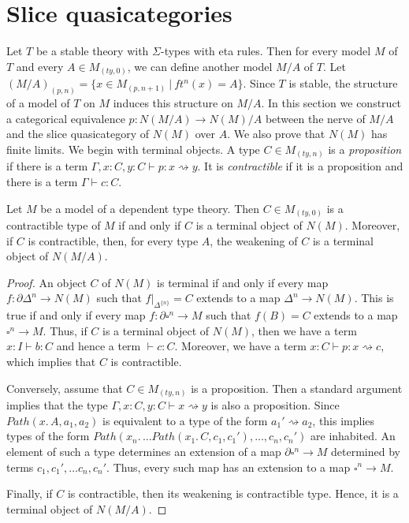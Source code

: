 \documentclass[reqno]{amsart}
\theoremstyle{definition}
\theoremstyle{remark}
\newcommand{\idtype}{\rightsquigarrow}
\numberwithin{figure}{section}
\begin{document}
\section{Slice quasicategories}

Let $T$ be a stable theory with $\Sigma$-types with eta rules.
Then for every model $M$ of $T$ and every $A \in M_{(ty,0)}$, we can define another model $M/A$ of $T$.
Let $(M/A)_{(p,n)} = \{ x \in M_{(p,n+1)}\ |\ ft^n(x) = A \}$.
Since $T$ is stable, the structure of a model of $T$ on $M$ induces this structure on $M/A$.
In this section we construct a categorical equivalence $p : N(M/A) \to N(M)/A$ between the nerve of $M/A$ and the slice quasicategory of $N(M)$ over $A$.
We also prove that $N(M)$ has finite limits.
We begin with terminal objects.
A type $C \in M_{(ty,n)}$ is a \emph{proposition} if there is a term $\Gamma, x : C, y : C \vdash p : x \idtype y$.
It is \emph{contractible} if it is a proposition and there is a term $\Gamma \vdash c : C$.

\begin{prop}
Let $M$ be a model of a dependent type theory.
Then $C \in M_{(ty,0)}$ is a contractible type of $M$ if and only if $C$ is a terminal object of $N(M)$.
Moreover, if $C$ is contractible, then, for every type $A$, the weakening of $C$ is a terminal object of $N(M/A)$.
\end{prop}
\begin{proof}
An object $C$ of $N(M)$ is terminal if and only if every map $f : \partial \Delta^n \to N(M)$ such that $f|_{\Delta^{\{n\}}} = C$ extends to a map $\Delta^n \to N(M)$.
This is true if and only if every map $f : \partial \square^n \to M$ such that $f(B) = C$ extends to a map $\square^n \to M$.
Thus, if $C$ is a terminal object of $N(M)$, then we have a term $x : I \vdash b : C$ and hence a term $\vdash c : C$.
Moreover, we have a term $x : C \vdash p : x \idtype c$, which implies that $C$ is contractible.

Conversely, assume that $C \in M_{(ty,n)}$ is a proposition.
Then a standard argument implies that the type $\Gamma, x : C, y : C \vdash x \idtype y$ is also a proposition.
Since $Path(x.\,A,a_1,a_2)$ is equivalent to a type of the form $a_1' \idtype a_2$,
this implies types of the form $Path(x_n.\, \ldots Path(x_1.\,C,c_1,c_1'), \ldots, c_n, c_n')$ are inhabited.
An element of such a type determines an extension of a map $\partial \square^n \to M$ determined by terms $c_1,c_1', \ldots c_n,c_n'$.
Thus, every such map has an extension to a map $\square^n \to M$.

Finally, if $C$ is contractible, then its weakening is contractible type.
Hence, it is a terminal object of $N(M/A)$.
\end{proof}
\end{document}
